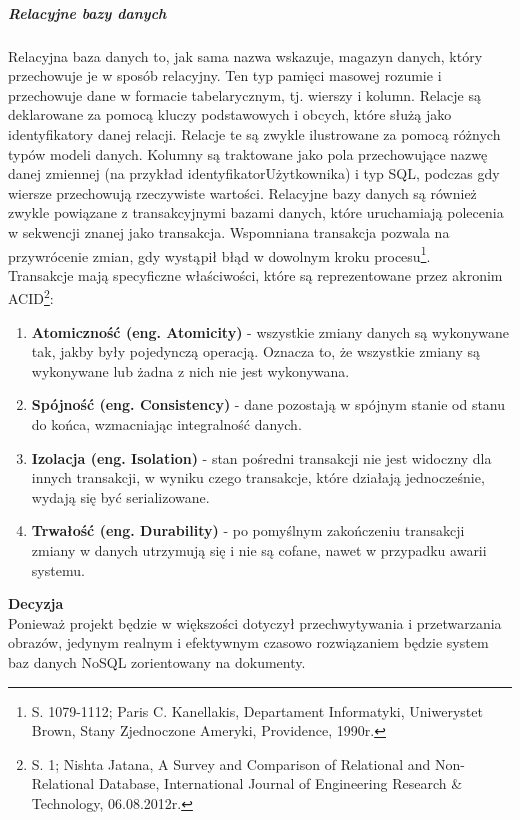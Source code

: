 \documentclass[12pt, a4paper, twoside, openany]{book}
\begin{document}
\subparagraph{Relacyjne bazy danych\\}
Relacyjna baza danych to, jak sama nazwa wskazuje, magazyn danych, który przechowuje je w sposób relacyjny.
Ten typ pamięci masowej rozumie i przechowuje dane w formacie tabelarycznym, tj. wierszy i kolumn.
Relacje są deklarowane za pomocą kluczy podstawowych i obcych, które służą jako identyfikatory danej relacji.
Relacje te są zwykle ilustrowane za pomocą różnych typów modeli danych.
Kolumny są traktowane jako pola przechowujące nazwę danej zmiennej (na przykład identyfikatorUżytkownika) i typ SQL, podczas gdy wiersze przechowują rzeczywiste wartości.
Relacyjne bazy danych są również zwykle powiązane z transakcyjnymi bazami danych, które uruchamiają polecenia w sekwencji znanej jako transakcja.
Wspomniana transakcja pozwala na przywrócenie zmian, gdy wystąpił błąd w dowolnym kroku procesu\footnote{S. 1079-1112; Paris C. Kanellakis, Departament Informatyki, Uniwerystet Brown, Stany Zjednoczone Ameryki, Providence, 1990r.}.\\
Transakcje mają specyficzne właściwości, które są reprezentowane przez akronim ACID\footnote{S. 1; Nishta Jatana, A Survey and Comparison of Relational and Non-Relational Database, International Journal of Engineering Research \& Technology, 06.08.2012r.}:
\begin{enumerate}[label=--]
    \item \textbf{Atomiczność (eng. Atomicity)} - wszystkie zmiany danych są wykonywane tak, jakby były pojedynczą operacją. Oznacza to, że wszystkie zmiany są wykonywane lub żadna z nich nie jest wykonywana.
    \item \textbf{Spójność (eng. Consistency)} - dane pozostają w spójnym stanie od stanu do końca, wzmacniając integralność danych.
    \item \textbf{Izolacja (eng. Isolation)} - stan pośredni transakcji nie jest widoczny dla innych transakcji, w wyniku czego transakcje, które działają jednocześnie, wydają się być serializowane.
    \item \textbf{Trwałość (eng. Durability)} - po pomyślnym zakończeniu transakcji zmiany w danych utrzymują się i nie są cofane, nawet w przypadku awarii systemu.
\end{enumerate}

\textbf{Decyzja}\\
Ponieważ projekt będzie w większości dotyczył przechwytywania i przetwarzania obrazów, jedynym realnym i efektywnym czasowo rozwiązaniem będzie system baz danych NoSQL zorientowany na dokumenty.
\end{document}
